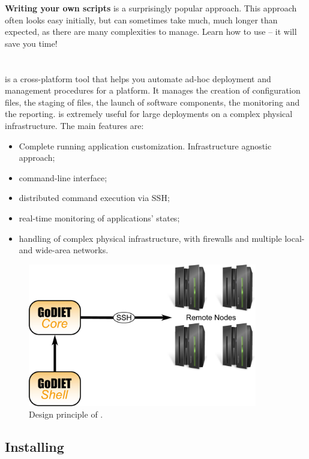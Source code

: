 \textbf{Writing your own scripts} is a surprisingly popular approach. This
approach often looks easy initially, but can sometimes take much, much longer
than expected, as there are many complexities to manage. Learn how to use \godiet -- it
will save you time!




\section{\godiet}
\label{sec:deployGoDIET}

\godiet is a cross-platform tool that helps you automate ad-hoc deployment and
management procedures for a \diet platform. It manages
the creation of configuration files, the staging of files, the launch of software components, the monitoring and the reporting. \godiet is extremely useful for large deployments on a complex physical infrastructure. The main features are:
\begin{itemize}
  \item \bla Complete running application customization. Infrastructure agnostic approach;
  \item command-line interface;
  \item distributed command execution via SSH;
  \item real-time monitoring of applications' states;
  \item handling of complex physical infrastructure, with firewalls and multiple local- and wide-area networks.
\end{itemize}
\begin{figure}[h]
  \centering
  \includegraphics[width=10cm]{fig/schemaPhilippe}
  \caption{Design principle of \godiet.\label{fig:GODIETDesign}}
\end{figure}



\subsection{Installing \godiet}

